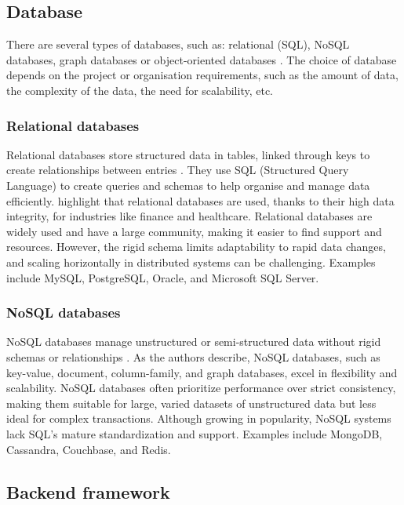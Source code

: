 \subsection{Database}

There are several types of databases, such as: relational (SQL), NoSQL databases, graph databases or object-oriented databases \parencite{databases2}. The choice of database depends on the project or organisation requirements, such as the amount of data, the complexity of the data, the need for scalability, etc. 

\subsubsection{Relational databases}

Relational databases store structured data in tables, linked through keys to create relationships between entries \parencite{databases}. They use SQL (Structured Query Language) to create queries and schemas to help organise and manage data efficiently. \textcite{databases} highlight that relational databases are used, thanks to their high data integrity, for industries like finance and healthcare. Relational databases are widely used and have a large community, making it easier to find support and resources. However, the rigid schema limits adaptability to rapid data changes, and scaling horizontally in distributed systems can be challenging. Examples include MySQL, PostgreSQL, Oracle, and Microsoft SQL Server.

\subsubsection{NoSQL databases}

NoSQL databases manage unstructured or semi-structured data without rigid schemas or relationships \parencite{databases}. As the authors describe, NoSQL databases, such as key-value, document, column-family, and graph databases, excel in flexibility and scalability. NoSQL databases often prioritize performance over strict consistency, making them suitable for large, varied datasets of unstructured data but less ideal for complex transactions. Although growing in popularity, NoSQL systems lack SQL’s mature standardization and support. Examples include MongoDB, Cassandra, Couchbase, and Redis.

\subsection{Backend framework}

